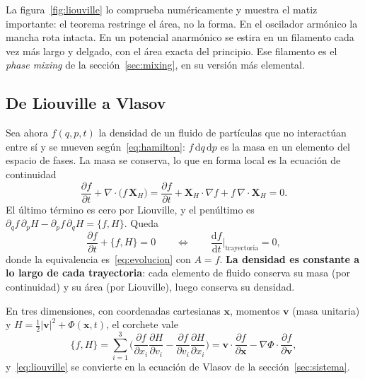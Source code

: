 \documentclass[11pt,a4paper]{article}
\newcommand{\dd}{\mathrm{d}}
\theoremstyle{definition}
\begin{document}
La figura~\ref{fig:liouville} lo comprueba numéricamente y muestra el matiz
importante: el teorema restringe el área, no la forma. En el oscilador armónico la
mancha rota intacta. En un potencial anarmónico se estira en un filamento cada vez
más largo y delgado, con el área exacta del principio. Ese filamento es el
\emph{phase mixing} de la sección~\ref{sec:mixing}, en su versión más elemental.

\subsection{De Liouville a Vlasov}

Sea ahora $f(q,p,t)$ la densidad de un fluido de partículas que no interactúan entre
sí y se mueven según~\eqref{eq:hamilton}: $f\,\dd q\,\dd p$ es la masa en un
elemento del espacio de fases. La masa se conserva, lo que en forma local es la
ecuación de continuidad
\begin{equation}
  \frac{\partial f}{\partial t} + \nabla\cdot\big(f\,\mathbf{X}_H\big)
  = \frac{\partial f}{\partial t} + \mathbf{X}_H\cdot\nabla f
    + f\,\nabla\cdot\mathbf{X}_H = 0 .
\end{equation}
El último término es cero por Liouville, y el penúltimo es
$\partial_qf\,\partial_pH-\partial_pf\,\partial_qH=\{f,H\}$. Queda
\begin{equation}
  \frac{\partial f}{\partial t} + \{f,H\} = 0
  \qquad\Longleftrightarrow\qquad
  \frac{\dd f}{\dd t}\Big|_{\text{trayectoria}} = 0 ,
  \label{eq:liouville}
\end{equation}
donde la equivalencia es~\eqref{eq:evolucion} con $A=f$. \textbf{La densidad es
constante a lo largo de cada trayectoria}: cada elemento de fluido conserva su masa
(por continuidad) y su área (por Liouville), luego conserva su densidad.

En tres dimensiones, con coordenadas cartesianas $\mathbf{x}$, momentos
$\mathbf{v}$ (masa unitaria) y $H=\tfrac12|\mathbf{v}|^2+\Phi(\mathbf{x},t)$, el
corchete vale
\begin{equation}
  \{f,H\}
  = \sum_{i=1}^{3}\Big(\frac{\partial f}{\partial x_i}\frac{\partial H}{\partial v_i}
                      -\frac{\partial f}{\partial v_i}\frac{\partial H}{\partial x_i}\Big)
  = \mathbf{v}\cdot\frac{\partial f}{\partial\mathbf{x}}
   -\nabla\Phi\cdot\frac{\partial f}{\partial\mathbf{v}} ,
\end{equation}
y~\eqref{eq:liouville} se convierte en la ecuación de Vlasov de la
sección~\ref{sec:sistema}.
\end{document}
